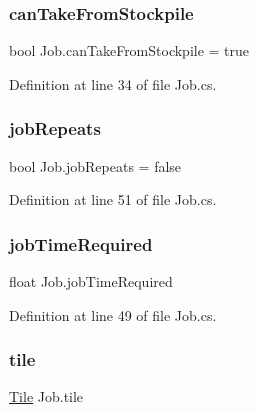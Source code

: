 \mbox{\label{class_job_aa7e8528a15ee13d00ef61f9dfb116f63}} 
\subsubsection{\texorpdfstring{can\+Take\+From\+Stockpile}{canTakeFromStockpile}}
{\footnotesize\ttfamily bool Job.\+can\+Take\+From\+Stockpile = true}



Definition at line 34 of file Job.\+cs.

\mbox{\label{class_job_a6987ac66f301cfb576dac72451328b39}} 
\subsubsection{\texorpdfstring{job\+Repeats}{jobRepeats}}
{\footnotesize\ttfamily bool Job.\+job\+Repeats = false\hspace{0.3cm}{\ttfamily [protected]}}



Definition at line 51 of file Job.\+cs.

\mbox{\label{class_job_a23e934caf9fd211ccc29ae1a8eeb99be}} 
\subsubsection{\texorpdfstring{job\+Time\+Required}{jobTimeRequired}}
{\footnotesize\ttfamily float Job.\+job\+Time\+Required\hspace{0.3cm}{\ttfamily [protected]}}



Definition at line 49 of file Job.\+cs.

\mbox{\label{class_job_a36c037d122ff255572942f7d3c949bbd}} 
\subsubsection{\texorpdfstring{tile}{tile}}
{\footnotesize\ttfamily \hyperlink{class_tile}{Tile} Job.\+tile}



